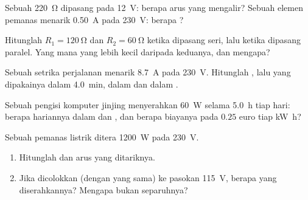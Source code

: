 \begin{exercise}[$\star$]\label{exo:g11:circuits-and-power:2}
Sebuah  \qty{220}{\ohm} dipasang pada \qty{12}{V}: berapa arus
yang mengalir? Sebuah elemen pemanas menarik \qty{0.50}{A} pada
\qty{230}{V}: berapa ?
\end{exercise}

\begin{exercise}[$\star$]\label{exo:g11:circuits-and-power:3}
Hitunglah  $R_1 = \qty{120}{\ohm}$ dan
$R_2 =
\qty{60}{\ohm}$ ketika dipasang seri, lalu ketika dipasang
paralel. Yang mana yang lebih kecil daripada keduanya, dan mengapa?
\end{exercise}

\begin{exercise}[$\star$]\label{exo:g11:circuits-and-power:4}
Sebuah setrika perjalanan menarik \qty{8.7}{A} pada \qty{230}{V}.
Hitunglah , lalu  yang dipakainya dalam \qty{4.0}{min},
dalam  dan dalam .
\end{exercise}

\begin{exercise}[$\star$]\label{exo:g11:circuits-and-power:5}
Sebuah pengisi  komputer jinjing menyerahkan \qty{60}{W} selama
\qty{5.0}{h} tiap hari: berapa  hariannya dalam  dan
, dan berapa biayanya pada $0.25$ euro tiap \unit{kW.h}?
\end{exercise}

\begin{exercise}[$\star\star$]\label{exo:g11:circuits-and-power:6}
Sebuah pemanas listrik ditera \qty{1200}{W} pada \qty{230}{V}.
\begin{enumerate}
  \item Hitunglah  dan arus yang ditariknya.
  \item Jika dicolokkan (dengan  yang sama) ke pasokan
        \qty{115}{V}, berapa  yang diserahkannya? Mengapa bukan
        separuhnya?
\end{enumerate}
\end{exercise}

